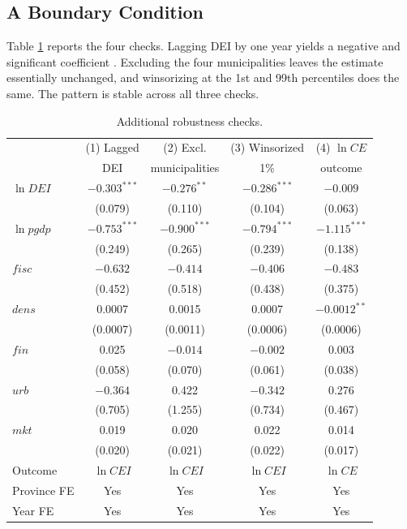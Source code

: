 \documentclass[economies,article,submit,moreauthors]{Definitions/mdpi}
\begin{document}
\subsection{A Boundary Condition}

Table \ref{tab:extra_robust} reports the four checks. Lagging DEI by one year yields a negative and significant coefficient \citep{bellemare2017}. Excluding the four municipalities leaves the estimate essentially unchanged, and winsorizing at the 1st and 99th percentiles does the same. The pattern is stable across all three checks.

\begin{table}[!htbp]
\centering
\caption{Additional robustness checks.}
\label{tab:extra_robust}
\footnotesize
\setlength{\tabcolsep}{5pt}
\begin{threeparttable}
\begin{tabular}{lcccc}
\toprule
 & (1) Lagged & (2) Excl. & (3) Winsorized & (4) $\ln CE$\\
 & DEI & municipalities & 1\% & outcome\\
\midrule
$\ln DEI$ & $-0.303^{***}$ & $-0.276^{**}$ & $-0.286^{***}$ & $-0.009$\\
 & (0.079) & (0.110) & (0.104) & (0.063)\\
\midrule
$\ln pgdp$ & $-0.753^{***}$ & $-0.900^{***}$ & $-0.794^{***}$ & $-1.115^{***}$\\
 & (0.249) & (0.265) & (0.239) & (0.138)\\
$fisc$ & $-0.632$ & $-0.414$ & $-0.406$ & $-0.483$\\
 & (0.452) & (0.518) & (0.438) & (0.375)\\
$dens$ & 0.0007 & 0.0015 & 0.0007 & $-0.0012^{**}$\\
 & (0.0007) & (0.0011) & (0.0006) & (0.0006)\\
$fin$ & 0.025 & $-0.014$ & $-0.002$ & 0.003\\
 & (0.058) & (0.070) & (0.061) & (0.038)\\
$urb$ & $-0.364$ & 0.422 & $-0.342$ & 0.276\\
 & (0.705) & (1.255) & (0.734) & (0.467)\\
$mkt$ & 0.019 & 0.020 & 0.022 & 0.014\\
 & (0.020) & (0.021) & (0.022) & (0.017)\\
\midrule
Outcome & $\ln CEI$ & $\ln CEI$ & $\ln CEI$ & $\ln CE$\\
Province FE & Yes & Yes & Yes & Yes\\
Year FE & Yes & Yes & Yes & Yes\\

\end{tabular}
\end{threeparttable}
\end{table}
\end{document}
